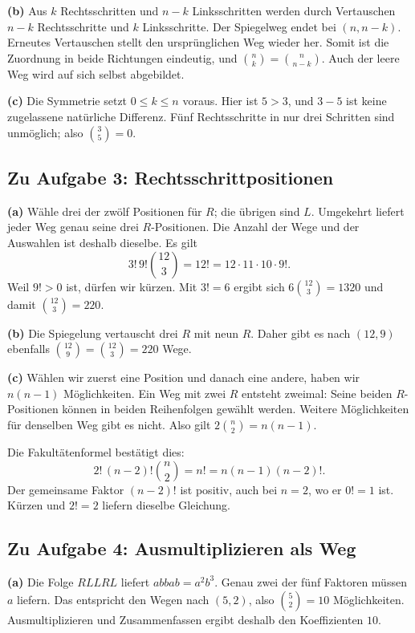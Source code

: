 \textbf{(b)} Aus $k$ Rechtsschritten und $n-k$ Linksschritten werden
durch Vertauschen $n-k$ Rechtsschritte und $k$ Linksschritte.
Der Spiegelweg endet bei $(n,n-k)$. Erneutes Vertauschen stellt den
ursprünglichen Weg wieder her. Somit ist die Zuordnung in beide
Richtungen eindeutig, und $\binom nk=\binom n{n-k}$.
Auch der leere Weg wird auf sich selbst abgebildet.

\textbf{(c)} Die Symmetrie setzt $0\le k\le n$ voraus. Hier ist
$5>3$, und $3-5$ ist keine zugelassene natürliche Differenz.
Fünf Rechtsschritte in nur drei Schritten sind unmöglich; also $\binom35=0$.

\subsection*{Zu Aufgabe 3: Rechtsschrittpositionen}
\textbf{(a)} Wähle drei der zwölf Positionen für $R$; die übrigen sind
$L$. Umgekehrt liefert jeder Weg genau seine drei $R$-Positionen.
Die Anzahl der Wege und der Auswahlen ist deshalb dieselbe. Es gilt
\[
 3!\,9!\binom{12}3=12!=12\cdot11\cdot10\cdot9!.
\]
Weil $9!>0$ ist, dürfen wir kürzen. Mit $3!=6$ ergibt sich
$6\binom{12}3=1320$ und damit $\binom{12}3=220$.

\textbf{(b)} Die Spiegelung vertauscht drei $R$ mit neun $R$.
Daher gibt es nach $(12,9)$ ebenfalls $\binom{12}9=\binom{12}3=220$ Wege.

\textbf{(c)} Wählen wir zuerst eine Position und danach eine andere,
haben wir $n(n-1)$ Möglichkeiten. Ein Weg mit zwei $R$ entsteht
zweimal: Seine beiden $R$-Positionen können in beiden Reihenfolgen
gewählt werden. Weitere Möglichkeiten für denselben Weg gibt es nicht.
Also gilt $2\binom n2=n(n-1)$.

Die Fakultätenformel bestätigt dies:
\[
 2!\,(n-2)!\binom n2=n!=n(n-1)(n-2)!.
\]
Der gemeinsame Faktor $(n-2)!$ ist positiv, auch bei $n=2$, wo er
$0!=1$ ist. Kürzen und $2!=2$ liefern dieselbe Gleichung.

\subsection*{Zu Aufgabe 4: Ausmultiplizieren als Weg}
\textbf{(a)} Die Folge $RLLRL$ liefert $abbab=a^2b^3$. Genau zwei
der fünf Faktoren müssen $a$ liefern. Das entspricht den Wegen nach
$(5,2)$, also $\binom52=10$ Möglichkeiten. Ausmultiplizieren und
Zusammenfassen ergibt deshalb den Koeffizienten $10$.

